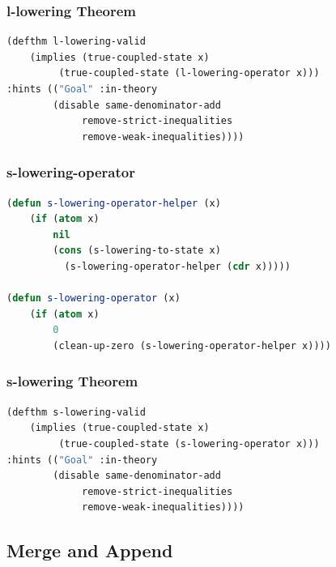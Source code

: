 \documentclass[
paper=128mm:96mm, %
fontsize=11pt, %
pagesize, %
parskip=half-, %
]{scrartcl} %
\theoremstyle{mythmstyle} %
\begin{document}
\clearpage

\subsubsection{l-lowering Theorem}

\begin{lstlisting}[language=Lisp,breaklines=true]
(defthm l-lowering-valid 
	(implies (true-coupled-state x)
		 (true-coupled-state (l-lowering-operator x)))
:hints (("Goal" :in-theory 
		(disable same-denominator-add 
			 remove-strict-inequalities 
			 remove-weak-inequalities))))
\end{lstlisting}

\clearpage

\subsubsection{s-lowering-operator}

\begin{lstlisting}[language=Lisp,breaklines=true]
(defun s-lowering-operator-helper (x)
	(if (atom x)
	    nil
	    (cons (s-lowering-to-state x) 
		  (s-lowering-operator-helper (cdr x)))))

(defun s-lowering-operator (x)
	(if (atom x)
	    0
	    (clean-up-zero (s-lowering-operator-helper x))))
\end{lstlisting}

\clearpage

\subsubsection{s-lowering Theorem}

\begin{lstlisting}[language=Lisp,breaklines=true]
(defthm s-lowering-valid 
	(implies (true-coupled-state x)
		 (true-coupled-state (s-lowering-operator x)))
:hints (("Goal" :in-theory 
		(disable same-denominator-add 
			 remove-strict-inequalities 
			 remove-weak-inequalities))))
\end{lstlisting}

\clearpage

\subsection{Merge and Append}
\end{document}

